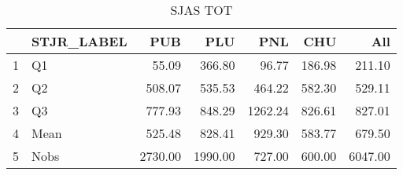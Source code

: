 \begin{table}[ht]
\centering
\begin{tabular}{rlrrrrr}
  \hline
 & STJR\_LABEL & PUB & PLU & PNL & CHU & All \\ 
  \hline
1 & Q1 & 55.09 & 366.80 & 96.77 & 186.98 & 211.10 \\ 
  2 & Q2 & 508.07 & 535.53 & 464.22 & 582.30 & 529.11 \\ 
  3 & Q3 & 777.93 & 848.29 & 1262.24 & 826.61 & 827.01 \\ 
  4 & Mean & 525.48 & 828.41 & 929.30 & 583.77 & 679.50 \\ 
  5 & Nobs & 2730.00 & 1990.00 & 727.00 & 600.00 & 6047.00 \\ 
   \hline
\end{tabular}
\caption{SJAS TOT} 
\end{table}
